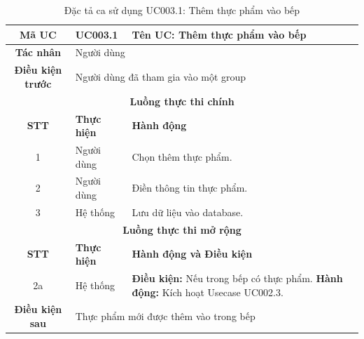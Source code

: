 \begin{table}[H]
    \centering
    \label{tab:uc003-1}
    \begin{tabularx}{\textwidth}{|c|p{3.5cm}|X|}
        \hline
        \rowcolor{headergreen} 
        \textbf{Mã UC} & \textbf{UC003.1} & \textbf{Tên UC: Thêm thực phẩm vào bếp} \\ \hline
        \textbf{Tác nhân} & \multicolumn{2}{l|}{Người dùng} \\ \hline
        \textbf{Điều kiện trước} & \multicolumn{2}{X|}{Người dùng đã tham gia vào một group} \\ \hline
        
        \multicolumn{3}{|c|}{\cellcolor{headerorange}\textbf{Luồng thực thi chính}} \\ \hline
        \rowcolor{graybg} \textbf{STT} & \textbf{Thực hiện} & \textbf{Hành động} \\ \hline
        1 & Người dùng & Chọn thêm thực phẩm. \\ \hline
        2 & Người dùng & Điền thông tin thực phẩm. \\ \hline
        3 & Hệ thống & Lưu dữ liệu vào database. \\ \hline
        
        \multicolumn{3}{|c|}{\cellcolor{headerorange}\textbf{Luồng thực thi mở rộng}} \\ \hline
        \rowcolor{graybg} \textbf{STT} & \textbf{Thực hiện} & \textbf{Hành động và Điều kiện} \\ \hline
        2a & Hệ thống & \textbf{Điều kiện:} Nếu trong bếp có thực phẩm. \newline
        \textbf{Hành động:} Kích hoạt Usecase UC002.3. \\ \hline
        
        \textbf{Điều kiện sau} & \multicolumn{2}{X|}{Thực phẩm mới được thêm vào trong bếp} \\ \hline
    \end{tabularx}
    \caption{Đặc tả ca sử dụng UC003.1: Thêm thực phẩm vào bếp}
\end{table}

